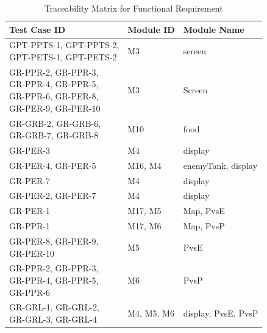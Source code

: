 \documentclass[12pt, titlepage]{article}
\begin{document}
\begin{table}[ht]
\begin{tabular}{|p{7cm}|p{3cm}|p{3cm}|}
 \hline
 Test Case ID & Module ID & Module Name\\
 
 
  \hline
 \makecell[l]{GPT-PPTS-1, GPT-PPTS-2,\\ GPT-PETS-1, GPT-PETS-2} & M3 & screen\\
  \hline
 \makecell[l]{GR-PPR-2, GR-PPR-3, \\GR-PPR-4, GR-PPR-5, \\GR-PPR-6, GR-PER-8, \\GR-PER-9, GR-PER-10} & M3 & Screen\\
  \hline
 \makecell[l]{GR-GRB-2, GR-GRB-6, \\GR-GRB-7, GR-GRB-8} & M10 & food\\
  \hline
 GR-PER-3 & M4 & display\\
  \hline
 GR-PER-4, GR-PER-5 & M16, M4 & enemyTank, display\\
  \hline
 GR-PER-7 & M4 & display\\
  \hline
 GR-PER-2, GR-PER-7 & M4 & display\\
  \hline
 GR-PER-1 & M17, M5 & Map, PvsE\\
  \hline
 GR-PPR-1 & M17, M6 & Map, PvsP\\
  \hline
 \makecell[l]{GR-PER-8, GR-PER-9, \\GR-PER-10} & M5 & PvsE\\
  \hline
 \makecell[l]{GR-PPR-2, GR-PPR-3, \\GR-PPR-4, GR-PPR-5, \\GR-PPR-6} & M6 & PvsP\\
  \hline
 \makecell[l]{GR-GRL-1, GR-GRL-2, \\GR-GRL-3, GR-GRL-4} & M4, M5, M6 & display, PvsE, PvsP\\
  \hline
\end{tabular}
\caption{Traceability Matrix for Functional Requirement}
\label{table: Traceability Matrix for Functional Requirement Test Case}
\end{table}
\end{document}
